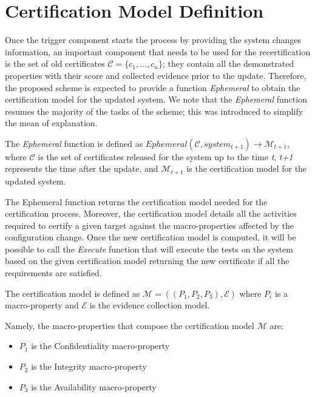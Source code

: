\section{Certification Model Definition}
Once the trigger component starts the process by providing the system changes information, an important component that needs to be used for the recertification is the set of old certificates \(\mathcal{C} = \{c_1, \dots, c_n\}\); they contain all the demonstrated properties with their score and collected evidence prior to the update. Therefore, the proposed scheme is expected to provide a function \textit{Ephemeral} to obtain the certification model for the updated system. We note that the \textit{Ephemeral} function resumes the majority of the tasks of the scheme; this was introduced to simplify the mean of explanation.

\begin{defn}
The \textit{Ephemeral} function is defined as \(Ephemeral(\mathcal{C}, system_{t+1}) \rightarrow {\mathcal{M}}_{t+1} \), where 
\(\mathcal{C}\) is the set of certificates released for the system up to the time \textit{t}, \textit{t+1} represents the time after the update, and \(\mathcal{M}_{t+1}\) is the certification model for the updated system.
\end{defn}

The Ephemeral function returns the certification model needed for the certification process. Moreover, the certification model details all the activities required to certify a given target against the macro-properties affected by the configuration change. Once the new certification model is computed, it will be possible to call the \textit{Execute} function that will execute the tests on the system based on the given certification model returning the new certificate if all the requirements are satisfied. 

\begin{defn}
The certification model is defined as 
\(\mathcal{M} = \left ( \left ( P_1, P_2, P_3 \right ), \mathcal{E} \right )\) where \(P_i\) is a macro-property and \( \mathcal{E} \) is the evidence collection model.
\end{defn}
Namely, the macro-properties that compose the certification model \(\mathcal{M}\) are:
\begin{itemize}
    \item \(P_1\) is the Confidentiality macro-property
    \item \(P_2\) is the Integrity macro-property
    \item \(P_3\) is the Availability macro-property
\end{itemize}
 
